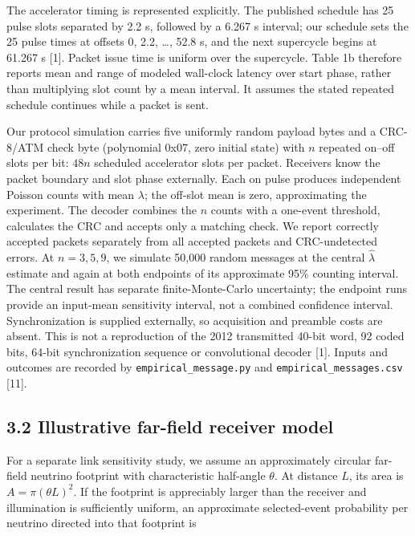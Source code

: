\documentclass[
]{article}
\begin{document}
The accelerator timing is represented explicitly. The published schedule
has 25 pulse slots separated by 2.2 s, followed by a 6.267 s interval;
our schedule sets the 25 pulse times at offsets 0, 2.2, \ldots, 52.8 s,
and the next supercycle begins at 61.267 s {[}1{]}. Packet issue time is
uniform over the supercycle. Table 1b therefore reports mean and range
of modeled wall-clock latency over start phase, rather than multiplying
slot count by a mean interval. It assumes the stated repeated schedule
continues while a packet is sent.

Our protocol simulation carries five uniformly random payload bytes and
a CRC-8/ATM check byte (polynomial 0x07, zero initial state) with \(n\)
repeated on--off slots per bit: \(48n\) scheduled accelerator slots per
packet. Receivers know the packet boundary and slot phase externally.
Each on pulse produces independent Poisson counts with mean
\({\lambda}\); the off-slot mean is zero, approximating the experiment.
The decoder combines the \(n\) counts with a one-event threshold,
calculates the CRC and accepts only a matching check. We report
correctly accepted packets separately from all accepted packets and
CRC-undetected errors. At \(n = 3, 5, 9\), we simulate 50,000 random
messages at the central \({\hat{\lambda}}\) estimate and again at both
endpoints of its approximate 95\% counting interval. The central result
has separate finite-Monte-Carlo uncertainty; the endpoint runs provide
an input-mean sensitivity interval, not a combined confidence interval.
Synchronization is supplied externally, so acquisition and preamble
costs are absent. This is not a reproduction of the 2012 transmitted
40-bit word, 92 coded bits, 64-bit synchronization sequence or
convolutional decoder {[}1{]}. Inputs and outcomes are recorded by
\texttt{empirical\_message.py} and \texttt{empirical\_messages.csv}
{[}11{]}.

\hypertarget{illustrative-far-field-receiver-model}{%
\subsection{3.2 Illustrative far-field receiver
model}\label{illustrative-far-field-receiver-model}}

For a separate link sensitivity study, we assume an approximately
circular far-field neutrino footprint with characteristic half-angle
\({\theta}\). At distance \(L\), its area is
\(A = {\pi}({\theta}L)^{2}\). If the footprint is appreciably larger
than the receiver and illumination is sufficiently uniform, an
approximate selected-event probability per neutrino directed into that
footprint is
\end{document}
